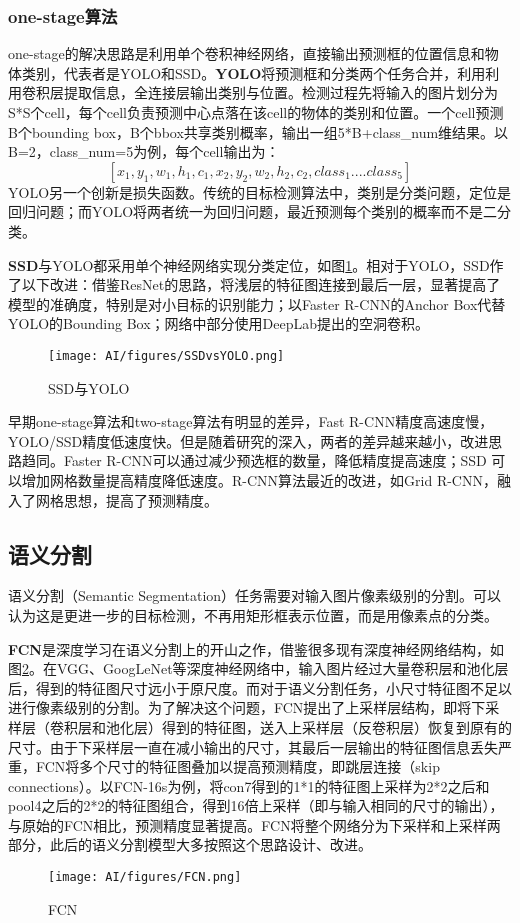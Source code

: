 \subsubsection{one-stage算法}
one-stage的解决思路是利用单个卷积神经网络，直接输出预测框的位置信息和物体类别，代表者是YOLO\cite{redmon2016you,redmon2017yolo9000}和SSD\cite{liu2016ssd}。\textbf{YOLO}将预测框和分类两个任务合并，利用利用卷积层提取信息，全连接层输出类别与位置。检测过程先将输入的图片划分为S*S个cell，每个cell负责预测中心点落在该cell的物体的类别和位置。一个cell预测B个bounding box，B个bbox共享类别概率，输出一组5*B+class\_num维结果。以B=2，class\_num=5为例，每个cell输出为：
$$
[x_1,y_1,w_1,h_1,c_1,x_2,y_2,w_2,h_2,c_2, class_1 .... class_5]
$$
YOLO另一个创新是损失函数。传统的目标检测算法中，类别是分类问题，定位是回归问题；而YOLO将两者统一为回归问题，最近预测每个类别的概率而不是二分类。

\textbf{SSD}与YOLO都采用单个神经网络实现分类定位，如图\ref{fig:SSDvsYOLO}。相对于YOLO，SSD作了以下改进：借鉴ResNet的思路，将浅层的特征图连接到最后一层，显著提高了模型的准确度，特别是对小目标的识别能力；以Faster R-CNN的Anchor Box代替YOLO的Bounding Box；网络中部分使用DeepLab提出的空洞卷积。
\begin{figure}
    \centering
    \texttt{[image: AI/figures/SSDvsYOLO.png]}
    \caption{SSD与YOLO}
    \label{fig:SSDvsYOLO}
\end{figure}

早期one-stage算法和two-stage算法有明显的差异，Fast R-CNN精度高速度慢，YOLO/SSD精度低速度快。但是随着研究的深入，两者的差异越来越小，改进思路趋同。Faster R-CNN可以通过减少预选框的数量，降低精度提高速度；SSD 可以增加网格数量提高精度降低速度\cite{huang2017speed}。R-CNN算法最近的改进，如Grid R-CNN\cite{lu2018grid}，融入了网格思想，提高了预测精度。

\subsection{语义分割}
语义分割（Semantic Segmentation）任务需要对输入图片像素级别的分割。可以认为这是更进一步的目标检测，不再用矩形框表示位置，而是用像素点的分类。

\textbf{FCN}\cite{long2015fully}是深度学习在语义分割上的开山之作，借鉴很多现有深度神经网络结构，如图\ref{fig:FCN}。在VGG、GoogLeNet等深度神经网络中，输入图片经过大量卷积层和池化层后，得到的特征图尺寸远小于原尺度。而对于语义分割任务，小尺寸特征图不足以进行像素级别的分割。为了解决这个问题，FCN提出了上采样层结构，即将下采样层（卷积层和池化层）得到的特征图，送入上采样层（反卷积层）恢复到原有的尺寸。由于下采样层一直在减小输出的尺寸，其最后一层输出的特征图信息丢失严重，FCN将多个尺寸的特征图叠加以提高预测精度，即跳层连接（skip connections）。以FCN-16s为例，将con7得到的1*1的特征图上采样为2*2之后和pool4之后的2*2的特征图组合，得到16倍上采样（即与输入相同的尺寸的输出），与原始的FCN相比，预测精度显著提高。FCN将整个网络分为下采样和上采样两部分，此后的语义分割模型大多按照这个思路设计、改进。
\begin{figure}
    \centering
    \texttt{[image: AI/figures/FCN.png]}
    \caption{FCN}
    \label{fig:FCN}
\end{figure}

